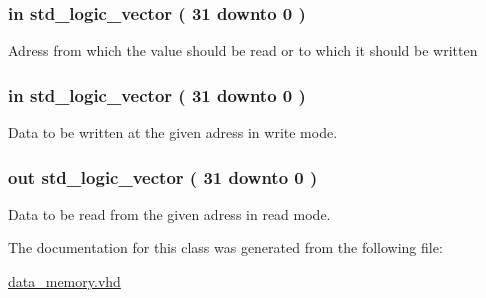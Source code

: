 \hypertarget{classdata__memory_a2defa08e23fedc6207b33f767eada3aa}{
\subsubsection[{adress}]{ {\bfseries in } {\bfseries std\-\_\-logic\-\_\-vector (   31    downto    0  ) } }}\label{classdata__memory_a2defa08e23fedc6207b33f767eada3aa}
\-Adress from which the value should be read or to which it should be written \hypertarget{classdata__memory_a51f56919bb46d2865cf22fe28742660b}{
\subsubsection[{write\-\_\-data}]{ {\bfseries in } {\bfseries std\-\_\-logic\-\_\-vector (   31    downto    0  ) } }}\label{classdata__memory_a51f56919bb46d2865cf22fe28742660b}


\-Data to be written at the given adress in write mode. 

\hypertarget{classdata__memory_a4cbcac52c2e90b6e7e111be703b6afdb}{
\subsubsection[{read\-\_\-data}]{ {\bfseries out } {\bfseries std\-\_\-logic\-\_\-vector (   31    downto    0  ) } }}\label{classdata__memory_a4cbcac52c2e90b6e7e111be703b6afdb}


\-Data to be read from the given adress in read mode. 



\-The documentation for this class was generated from the following file\-:\begin{DoxyCompactItemize}
\item 
\hyperlink{data__memory_8vhd}{data\-\_\-memory.\-vhd}\end{DoxyCompactItemize}
